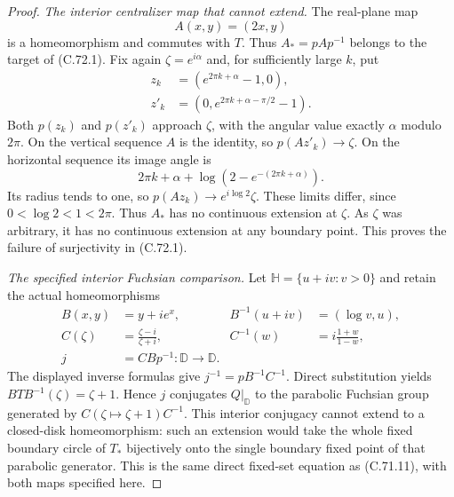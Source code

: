 \begin{proof}
\emph{The interior centralizer map that cannot extend.}
The real-plane map
\[
                        A(x,y)=(2x,y)
                                                               \tag{C.72.13}
\]
is a homeomorphism and commutes with $T$. Thus
$A_*=pAp^{-1}$ belongs to the target of (C.72.1).
Fix again $\zeta=e^{i\alpha}$ and, for sufficiently
large $k$, put
\[
 \begin{split}
 z_k&=(e^{2\pi k+\alpha}-1,0),\\
 z'_k&=(0,e^{2\pi k+\alpha-\pi/2}-1).
 \end{split}                                                   \tag{C.72.14}
\]
Both $p(z_k)$ and $p(z'_k)$ approach $\zeta$,
with the angular value exactly $\alpha$ modulo
$2\pi$. On the vertical sequence $A$ is the
identity, so $p(Az'_k)\to\zeta$. On the horizontal
sequence its image angle is
\[
 2\pi k+\alpha+
            \log(2-e^{-(2\pi k+\alpha)}).
                                                               \tag{C.72.15}
\]
Its radius tends to one, so
$p(Az_k)\to e^{i\log2}\zeta$.
These limits differ, since $0<\log2<1<2\pi$.
Thus $A_*$ has no continuous extension at $\zeta$.
As $\zeta$ was arbitrary, it has no continuous
extension at any boundary point. This proves the
failure of surjectivity in (C.72.1).

\emph{The specified interior Fuchsian comparison.}
Let $\mathbb H=\{u+iv:v>0\}$ and retain the actual
homeomorphisms
\[
 \begin{aligned}
 B(x,y)&=y+i e^x,& B^{-1}(u+iv)&=(\log v,u),\\
 C(\zeta)&=\frac{\zeta-i}{\zeta+i},&
 C^{-1}(w)&=i\frac{1+w}{1-w},\\
 j&=CBp^{-1}:\mathbb D\longrightarrow\mathbb D .
 \end{aligned}                                                   \tag{C.72.16}
\]
The displayed inverse formulas give
$j^{-1}=pB^{-1}C^{-1}$.
Direct substitution yields
$BTB^{-1}(\zeta)=\zeta+1$.
Hence $j$ conjugates $Q|_{\mathbb D}$ to the
parabolic Fuchsian group generated by
$C(\zeta\mapsto\zeta+1)C^{-1}$.
This interior conjugacy cannot extend to a
closed-disk homeomorphism: such an extension
would take the whole fixed boundary circle of
$T_*$ bijectively onto the single boundary
fixed point of that parabolic generator.
This is the same direct fixed-set equation as
(C.71.11), with both maps specified here.


\end{proof}
